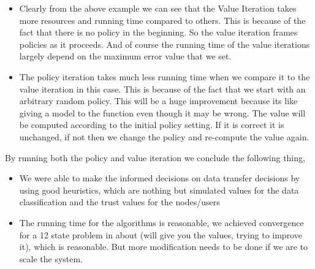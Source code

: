 \begin{itemize}
    \item Clearly from the above example we can see that the Value Iteration takes
more resources and running time compared to others. This is because of the fact
that there is no policy in the beginning. So the value iteration frames policies
as it proceeds. And of course the running time of the value iterations largely
depend on the maximum error value that we set.
    \item The policy iteration takes much less running time when we compare it to the
value iteration in this case. This is because of the fact that we start with an
arbitrary random policy. This will be a huge improvement because its like giving
a model to the function even though it may be wrong. The value will be computed
according to the initial policy setting. If it is correct it is unchanged, if
not then we change the policy and re-compute the value again.
\end{itemize}
By running both the policy and value iteration we conclude the following thing,
\begin{itemize}
    \item We were able to make the informed decisions on data transfer decisions by
using good heuristics, which are nothing but simulated values for the data
classification and the trust values for the nodes/users
    \item The running time for
the algorithms is reasonable, we achieved convergence for a 12 state problem in
about (will give you the values, trying to improve it), which is reasonable. But
more modification needs to be done if we are to scale the system.
\end{itemize}
